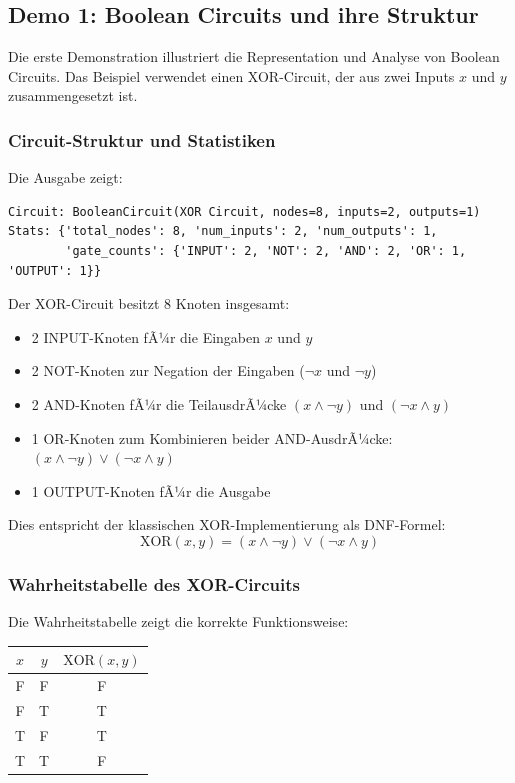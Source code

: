 ﻿\documentclass[a4paper,12pt]{article}
\theoremstyle{definition}
\begin{document}
\subsection{Demo 1: Boolean Circuits und ihre Struktur}

Die erste Demonstration illustriert die Representation und Analyse von Boolean Circuits. Das Beispiel verwendet einen XOR-Circuit, der aus zwei Inputs $x$ und $y$ zusammengesetzt ist.

\subsubsection{Circuit-Struktur und Statistiken}

Die Ausgabe zeigt:
\begin{lstlisting}
Circuit: BooleanCircuit(XOR Circuit, nodes=8, inputs=2, outputs=1)
Stats: {'total_nodes': 8, 'num_inputs': 2, 'num_outputs': 1, 
        'gate_counts': {'INPUT': 2, 'NOT': 2, 'AND': 2, 'OR': 1, 'OUTPUT': 1}}
\end{lstlisting}

Der XOR-Circuit besitzt 8 Knoten insgesamt:
\begin{itemize}
    \item 2 INPUT-Knoten fÃ¼r die Eingaben $x$ und $y$
    \item 2 NOT-Knoten zur Negation der Eingaben ($\neg x$ und $\neg y$)
    \item 2 AND-Knoten fÃ¼r die TeilausdrÃ¼cke $(x \land \neg y)$ und $(\neg x \land y)$
    \item 1 OR-Knoten zum Kombinieren beider AND-AusdrÃ¼cke: $(x \land \neg y) \lor (\neg x \land y)$
    \item 1 OUTPUT-Knoten fÃ¼r die Ausgabe
\end{itemize}

Dies entspricht der klassischen XOR-Implementierung als DNF-Formel:
\[
\text{XOR}(x, y) = (x \land \neg y) \lor (\neg x \land y)
\]

\subsubsection{Wahrheitstabelle des XOR-Circuits}

Die Wahrheitstabelle zeigt die korrekte Funktionsweise:
\begin{center}
\begin{tabular}{cc|c}
$x$ & $y$ & $\text{XOR}(x, y)$ \\
\hline
F & F & F \\
F & T & T \\
T & F & T \\
T & T & F
\end{tabular}
\end{center}
\end{document}
